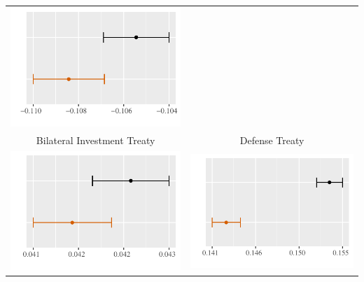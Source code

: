 \documentclass[reqno,onecolumn,letterpaper,12pt]{article}
\begin{document}
\begin{longtable}[!h]{c@{\hskip 0cm}c}
\includegraphics[height=.18\textheight, clip=true, trim=0cm 0cm 0cm .2cm]{draft_figures/plots_pooled/AllianceTreaty.pdf}   \\
Bilateral Investment Treaty & Defense Treaty\\
\includegraphics[height=.18\textheight, clip=true, trim=0cm 0cm 0cm .2cm]{draft_figures/plots_pooled/BIT.pdf} &
\includegraphics[height=.18\textheight, clip=true, trim=0cm 0cm 0cm .2cm]{draft_figures/plots_pooled/DefenseTreaty.pdf}   \\

\end{longtable}
\end{document}
